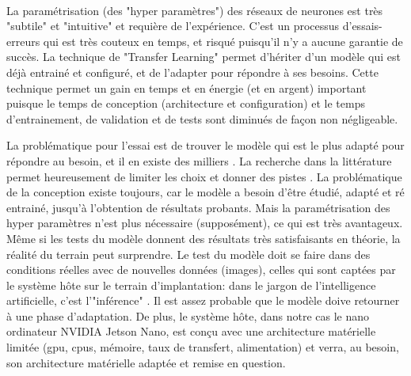 \vspace{\baselineskip}
\\
\noindent La paramétrisation (des "hyper paramètres") des réseaux de neurones est très "subtile" et "intuitive" et requière de l'expérience. C'est un processus d'essais-erreurs qui est très couteux en temps, et risqué puisqu'il n'y a aucune garantie de succès. La technique de "Transfer Learning" permet d'hériter d'un modèle qui est déjà entrainé et configuré, et de l'adapter pour répondre à ses besoins. Cette technique permet un gain en temps et en énergie (et en argent) important puisque le temps de conception (architecture et configuration) et le temps d'entrainement, de validation et de tests sont diminués de façon non négligeable.
\begin{comment}
Par exemple le modèle "VGG" prend 2-3 semaines d'entrainement \parencite{simonyan_very_2015} avec 4 \acrshort{gpu} Titan Black (NVIDIA), coutant 1,200\$US (Amazon.com) chacun (pour un total de 4,800\$US, et cela juste pour les \acrshort{gpu}s, qui ne sont qu'un des éléments de l'infrastructure nécessaire). Étant donné que de multiples tentatives sont nécessaires (cycles essai-erreur), la stratégie est d'entrainer plusieurs modèles en parallèle afin d'accélérer le développement, ce qui implique un cout élevé en infrastructure.
\end{comment}
La problématique pour l'essai est de trouver le modèle qui est le plus adapté pour répondre au besoin, et il en existe des milliers \parencite{koh_model_2018}. La recherche dans la littérature permet heureusement de limiter les choix et donner des pistes \parencite{zheng_real-time_2020} \parencite{nguyen_mavnet_2019} \parencite{nvidia_jetson_2019-1}. La problématique de la conception existe toujours, car le modèle a besoin d'être étudié, adapté et ré entrainé, jusqu'à l'obtention de résultats probants. Mais la paramétrisation des hyper paramètres n'est plus nécessaire (supposément), ce qui est très avantageux.
\vspace{\baselineskip}
\\
\noindent Même si les tests du modèle donnent des résultats très satisfaisants en théorie, la réalité du terrain peut surprendre. Le test du modèle doit se faire dans des conditions réelles avec de nouvelles données (images), celles qui sont captées par le système hôte sur le terrain d'implantation: dans le jargon de l'intelligence artificielle, c'est l'"inférence" \parencite{copel_whats_2016} \parencite{nvidia_jetson_2019-1}. Il est assez probable que le modèle doive retourner à une phase d'adaptation. De plus, le système hôte, dans notre cas le nano ordinateur NVIDIA Jetson Nano, est conçu avec une architecture matérielle limitée (\acrshort{gpu}, \acrshort{cpu}s, mémoire, taux de transfert, alimentation) et verra, au besoin, son architecture matérielle adaptée et remise en question.